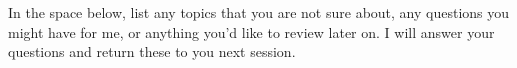 \question
In the space below, list any topics that you are not sure about, any questions
you might have for me, or anything you'd like to review later on. I will answer
your questions and return these to you next session. 

\makeemptybox{\fill}
